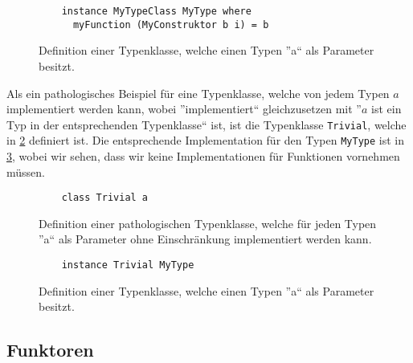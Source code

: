 \documentclass{hhuarticle}
\theoremstyle{definition}
\theoremstyle{theorem}
\begin{document}
  \begin{figure}[h]
    \begin{verbatim}
    instance MyTypeClass MyType where
      myFunction (MyConstruktor b i) = b
    \end{verbatim}
    \caption{Definition einer Typenklasse, welche einen Typen ''a`` als Parameter besitzt.}%
    \label{fig:mytypeinstance}
  \end{figure}

  Als ein pathologisches Beispiel für eine Typenklasse, welche von jedem
  Typen $a$ implementiert werden kann, wobei ''implementiert`` gleichzusetzen
  mit ''$a$ ist ein Typ in der entsprechenden Typenklasse`` ist, ist die
  Typenklasse \verb|Trivial|, welche in \cref{fig:trivialTypeClass} definiert ist.
  Die entsprechende Implementation für den Typen \verb|MyType| ist in \cref{fig:trivialTypeClassInstance},
  wobei wir sehen, dass wir keine Implementationen
  für Funktionen vornehmen müssen.

  \begin{figure}[h]
    \begin{verbatim}
    class Trivial a
    \end{verbatim}
    \caption{Definition einer pathologischen Typenklasse, welche für jeden Typen ''a`` als Parameter ohne Einschränkung implementiert werden kann.}%
    \label{fig:trivialTypeClass}
  \end{figure}

  \begin{figure}[h]
    \begin{verbatim}
    instance Trivial MyType
    \end{verbatim}
    \caption{Definition einer Typenklasse, welche einen Typen ''a`` als Parameter besitzt.}%
    \label{fig:trivialTypeClassInstance}
  \end{figure}

  \subsection{Funktoren}
\end{document}
